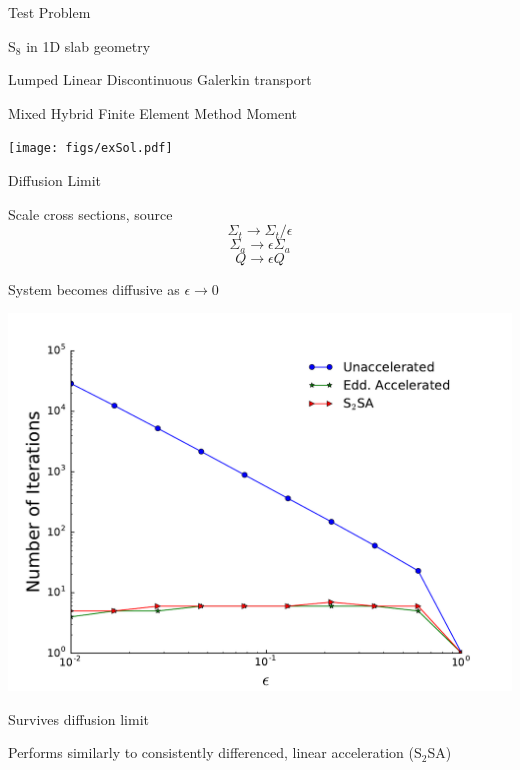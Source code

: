 \documentclass[10pt,draft]{beamer}
\begin{document}

\begin{frame}{Test Problem}

	S$_8$ in 1D slab geometry 

	Lumped Linear Discontinuous Galerkin transport 

	Mixed Hybrid Finite Element Method Moment 

	\vfill
	\centerline{\texttt{[image: figs/exSol.pdf]}}

\end{frame}

\begin{frame}{Diffusion Limit}

	\footnotesize
	Scale cross sections, source 
	$$\Sigma_t \rightarrow \Sigma_t/\epsilon $$
	$$\Sigma_a \rightarrow \epsilon \Sigma_a$$
	$$Q \rightarrow \epsilon Q$$ 

	System becomes diffusive as $\epsilon \rightarrow 0$ 

	\pause
	\centerline{\includegraphics[width=.5\paperwidth]{figs/diffLimit.pdf}}

	\pause
	Survives diffusion limit 

	\pause
	Performs similarly to consistently differenced, linear acceleration (S$_2$SA)

\end{frame}
\end{document}
